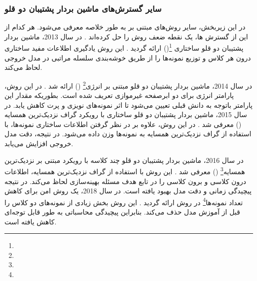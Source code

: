 \subsubsection{سایر گسترش‌های ماشین بردار پشتیبان دو قلو}\label{sec:2:2:3:4}
در این زیربخش، سایر روش‌های مبتنی بر  به طور خلاصه معرفی می‌شود. هر کدام از این از گسترش ها، یک نقطه ضعف روش  را حل کرده‌اند \cite{ding2014,ding2017,huang2018}. در سال 2013، ماشین بردار پشتیبان دو قلو ساختاری  \footnote{}() ارائه گردید \cite{qi2013}.  این روش یادگیری اطلاعات مفید ساختاری درون هر کلاس و توزیع نمونه‌ها را از طریق خوشه‌بندی سلسله مراتبی در مدل خروجی لحاظ می‌کند.  

در سال 2014، ماشین بردار پشتیبان دو قلو مبتنی بر انرژی\footnote{}  () ارائه شد \cite{nasiri2014}. در این روش، پارامتر انرژی برای دو ابرصفحه غیرموازی تعریف شده است. بطوریکه مقدار این پارامتر باتوجه به دانش قبلی تعیین می‌شود تا اثر نمونه‌های نویزی و پرت کاهش یابد. در سال 2015، ماشین بردار پشتیبان دو قلو ساختاری با رویکرد گراف نزدیک‌ترین همسایه () معرفی شد \cite{pan2015}. در این روش، علاوه بر در نظر گرفتن اطلاعات ساختاری نمونه‌ها، با استفاده از گراف نزدیک‌ترین همسایه به نمونه‌ها وزن داده می‌شود. در نتیجه، دقت مدل خروجی افزایش می‌یابد.

در سال 2016، ماشین بردار پشتیبان دو قلو چند کلاسه با رویکرد مبتنی بر نزدیک‌ترین همسایه\footnote{}  () معرفی شد \cite{xu2016}. این روش با استفاده از گراف نزدیک‌ترین همسایه، اطلاعات درون کلاسی و برون کلاسی را در تابع هدف مسئله بهینه‌سازی لحاظ می‌کند. در نتیجه پیچیدگی زمانی و دقت مدل بهبود یافته است. در سال 2018، یک روش امن برای کاهش تعداد نمونه‌ها\footnote{}  در روش  ارائه گردید \cite{pang2018}. این روش بخش زیادی از نمونه‌های دو کلاس را قبل از آموزش مدل حذف می‌کند. بنابراین پیچیدگی محاسباتی به طور قابل توجه‌ای کاهش یافته است. 

